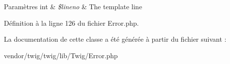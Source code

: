 \begin{DoxyParams}[1]{Paramètres}
int & {\em \$lineno} & The template line \\
\hline
\end{DoxyParams}


Définition à la ligne 126 du fichier Error.\+php.



La documentation de cette classe a été générée à partir du fichier suivant \+:\begin{DoxyCompactItemize}
\item 
vendor/twig/twig/lib/\+Twig/Error.\+php\end{DoxyCompactItemize}
